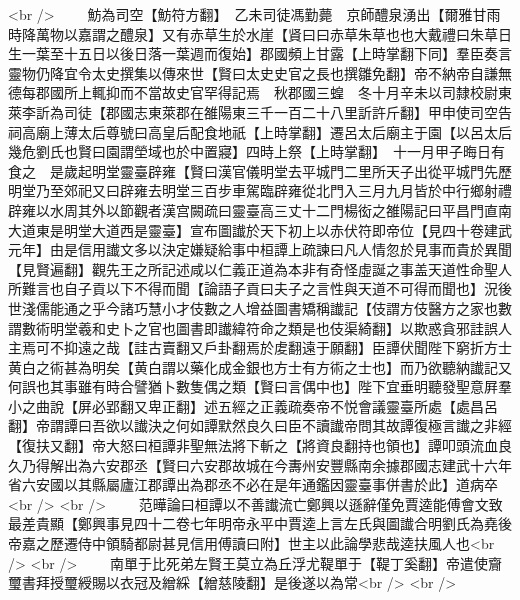 <br />
　　魴為司空【魴符方翻】　乙未司徒馮勤薨　京師醴泉湧出【爾雅甘雨時降萬物以嘉謂之醴泉】又有赤草生於水崖【䝨曰曰赤草朱草也也大戴禮曰朱草日生一葉至十五日以後日落一葉週而復始】郡國頻上甘露【上時掌翻下同】羣臣奏言靈物仍降宜令太史撰集以傳來世【賢曰太史史官之長也撰雛免翻】帝不納帝自謙無德每郡國所上輒抑而不當故史官罕得記焉　秋郡國三蝗　冬十月辛未以司隸校尉東萊李訢為司徒【郡國志東萊郡在雒陽東三千一百二十八里訢許斤翻】甲申使司空告祠高廟上薄太后尊號曰高皇后配食地祇【上時掌翻】遷呂太后廟主于園【以呂太后幾危劉氏也賢曰園謂塋域也於中置寢】四時上祭【上時掌翻】　十一月甲子晦日有食之　是歲起明堂靈臺辟雍【賢曰漢官儀明堂去平城門二里所天子出從平城門先歷明堂乃至郊祀又曰辟雍去明堂三百步車駕臨辟雍從北門入三月九月皆於中行鄉射禮辟雍以水周其外以節觀者漢宫闕疏曰靈臺高三丈十二門楊衒之雒陽記曰平昌門直南大道東是明堂大道西是靈臺】宣布圖䜟於天下初上以赤伏符即帝位【見四十卷建武元年】由是信用䜟文多以決定嫌疑給事中桓譚上疏諫曰凡人情忽於見事而貴於異聞【見賢遍翻】觀先王之所記述咸以仁義正道為本非有奇怪虛誕之事盖天道性命聖人所難言也自子貢以下不得而聞【論語子貢曰夫子之言性與天道不可得而聞也】況後世淺儒能通之乎今諸巧慧小才伎數之人增益圖書矯稱䜟記【伎謂方伎醫方之家也數謂數術明堂羲和史卜之官也圖書即䜟緯符命之類是也伎渠綺翻】以欺惑貪邪詿誤人主焉可不抑遠之哉【詿古賣翻又戶卦翻焉於䖍翻遠于願翻】臣譚伏聞陛下窮折方士黄白之術甚為明矣【黄白謂以藥化成金銀也方士有方術之士也】而乃欲聽納䜟記又何誤也其事雖有時合譬猶卜數隻偶之類【賢曰言偶中也】陛下宜垂明聽發聖意屛羣小之曲說【屏必郢翻又卑正翻】述五經之正義疏奏帝不悦會議靈臺所處【處昌呂翻】帝謂譚曰吾欲以䜟決之何如譚默然良久曰臣不讀䜟帝問其故譚復極言䜟之非經【復扶又翻】帝大怒曰桓譚非聖無法將下斬之【將資良翻持也領也】譚叩頭流血良久乃得解出為六安郡丞【賢曰六安郡故城在今夀州安豐縣南余據郡國志建武十六年省六安國以其縣屬廬江郡譚出為郡丞不必在是年通鑑因靈臺事併書於此】道病卒<br />
<br />
　　范曄論曰桓譚以不善䜟流亡鄭興以遜辭僅免賈逵能傅會文致最差貴顯【鄭興事見四十二卷七年明帝永平中賈逵上言左氏與圖䜟合明劉氏為堯後帝嘉之歷遷侍中領騎都尉甚見信用傅讀曰附】世主以此論學悲哉逵扶風人也<br />
<br />
　　南單于比死弟左賢王莫立為丘浮尤鞮單于【鞮丁奚翻】帝遣使齎璽書拜授璽綬賜以衣冠及繒綵【繒慈陵翻】是後遂以為常<br />
<br />
